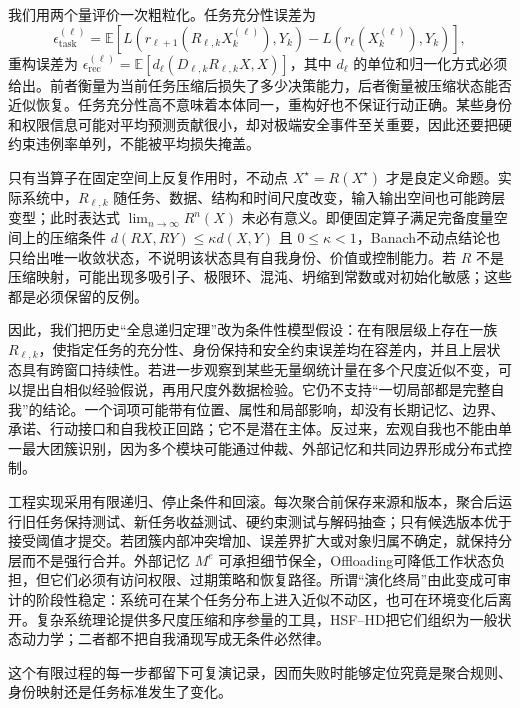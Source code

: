 我们用两个量评价一次粗粒化。任务充分性误差为
\[
\epsilon_{\mathrm{task}}^{(\ell)}=
\mathbb E\!\left[L\!\left(r_{\ell+1}(R_{\ell,k}X_k^{(\ell)}),Y_k\right)
-L\!\left(r_{\ell}(X_k^{(\ell)}),Y_k\right)\right],
\]
重构误差为 $\epsilon_{\mathrm{rec}}^{(\ell)}=\mathbb E[d_\ell(D_{\ell,k}R_{\ell,k}X,X)]$，其中 $d_\ell$ 的单位和归一化方式必须给出。前者衡量为当前任务压缩后损失了多少决策能力，后者衡量被压缩状态能否近似恢复。任务充分性高不意味着本体同一，重构好也不保证行动正确。某些身份和权限信息可能对平均预测贡献很小，却对极端安全事件至关重要，因此还要把硬约束违例率单列，不能被平均损失掩盖。

只有当算子在固定空间上反复作用时，不动点 $X^\star=R(X^\star)$ 才是良定义命题。实际系统中，$R_{\ell,k}$ 随任务、数据、结构和时间尺度改变，输入输出空间也可能跨层变型；此时表达式 $\lim_{n\to\infty}R^n(X)$ 未必有意义。即便固定算子满足完备度量空间上的压缩条件 $d(RX,RY)\leq\kappa d(X,Y)$ 且 $0\leq\kappa<1$，Banach不动点结论也只给出唯一收敛状态，不说明该状态具有自我身份、价值或控制能力。若 $R$ 不是压缩映射，可能出现多吸引子、极限环、混沌、坍缩到常数或对初始化敏感；这些都是必须保留的反例。

因此，我们把历史“全息递归定理”改为条件性模型假设：在有限层级上存在一族 $R_{\ell,k}$，使指定任务的充分性、身份保持和安全约束误差均在容差内，并且上层状态具有跨窗口持续性。若进一步观察到某些无量纲统计量在多个尺度近似不变，可以提出自相似经验假说，再用尺度外数据检验。它仍不支持“一切局部都是完整自我”的结论。一个词项可能带有位置、属性和局部影响，却没有长期记忆、边界、承诺、行动接口和自我校正回路；它不是潜在主体。反过来，宏观自我也不能由单一最大团簇识别，因为多个模块可能通过仲裁、外部记忆和共同边界形成分布式控制。

工程实现采用有限递归、停止条件和回滚。每次聚合前保存来源和版本，聚合后运行旧任务保持测试、新任务收益测试、硬约束测试与解码抽查；只有候选版本优于接受阈值才提交。若团簇内部冲突增加、误差界扩大或对象归属不确定，就保持分层而不是强行合并。外部记忆 $M^e$ 可承担细节保全，Offloading可降低工作状态负担，但它们必须有访问权限、过期策略和恢复路径。所谓“演化终局”由此变成可审计的阶段性稳定：系统可在某个任务分布上进入近似不动区，也可在环境变化后离开。复杂系统理论提供多尺度压缩和序参量的工具，HSF--HD把它们组织为一般状态动力学；二者都不把自我涌现写成无条件必然律。

这个有限过程的每一步都留下可复演记录，因而失败时能够定位究竟是聚合规则、身份映射还是任务标准发生了变化。

